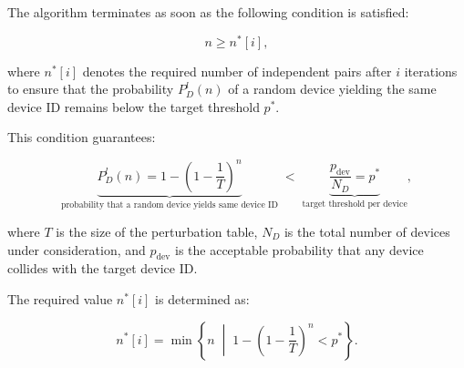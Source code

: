 \documentclass[twocolumn]{report}
\begin{document}
%

The algorithm \alert{terminates} as soon as the following condition is satisfied:

\vspace{-0.2cm}
\begin{minipage}{\columnwidth}
\[
  n \ge n^*[i],
\]
\end{minipage}

where \( n^*[i] \) denotes the required \alert{number of independent pairs} after \( i \) \alert{iterations} to ensure that the \alert{probability} \( P^l_D(n) \) of a random device yielding the same device ID remains below the target threshold \( p^* \).

This condition guarantees:
\vspace{-0.8cm}
\begin{center}
  \begin{adjustbox}{max width=\columnwidth}
    \begin{minipage}[t]{0.6\textwidth}
\[
  \underbrace{P^l_D(n) 
  = 1 - \left(1 - \frac{1}{T}\right)^n}_{\text{probability that a random device yields same device ID}}
  \;<\;
  \underbrace{\frac{p_{\text{dev}}}{N_D} = p^*}_{\text{target threshold per device}},
\]
    \end{minipage}
  \end{adjustbox}
\end{center}
where \( T \) is the \alert{size of the perturbation table}, \( N_D \) is the \alert{total number of devices} under consideration, and \( p_{\text{dev}} \) is the \alert{acceptable probability} that any device collides with the target device ID.

The required value \( n^*[i] \) is determined as:

\begin{minipage}{\columnwidth}
\[
  n^*[i] 
  = \min \left\{ n \;\middle|\; 1 - \left(1 - \frac{1}{T}\right)^n < p^* \right\}.
\]
\end{minipage}
\end{document}
